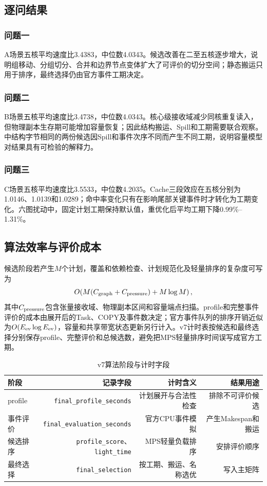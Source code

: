 \subsection{逐问结果}
\subsubsection{问题一}
A场景五核平均速度比3.4383，中位数4.0343。候选改善在二至五核逐步增大，说明组移动、分组切分、合并和边界节点变体扩大了可评价的切分空间；静态搬运只用于排序，最终选择仍由官方事件工期决定。

\subsubsection{问题二}
B场景五核平均速度比3.4738，中位数4.0343。核心级接收域减少同核重复读入，但物理副本生存期可能增加容量恢复；因此结构搬运、Spill和工期需要联合观察。中结构字节相同的两份候选因Spill和事件次序不同而产生不同工期，说明容量模型对结果具有可检验的解释力。

\subsubsection{问题三}
C场景五核平均速度比3.5533，中位数4.2035。Cache三段效应在五核分别为1.0146、1.0139和1.0289；命中率变化只有在影响尾部关键事件时才转化为工期变化。六图扰动中，固定计划工期保持默认值，重优化后平均工期下降0.99\%--1.31\%。

\subsection{算法效率与评价成本}
候选阶段若产生$M$个计划，覆盖和依赖检查、计划规范化及轻量排序的复杂度可写为
\begin{equation}
O\!\left(M(C_{\rm graph}+C_{\rm pressure})+M\log M\right),
\end{equation}
其中$C_{\rm pressure}$包含张量接收域、物理副本区间和容量端点扫描。profile和完整事件评价的成本由展开后的Task、COPY及事件数决定；官方事件队列的排序开销近似为$O(E_{\rm ev}\log E_{\rm ev})$，容量和共享带宽状态更新另行计入。v7计时表按候选和最终选择分别保存profile、完整评价和总候选数，避免把MPS轻量排序时间误写成官方工期。

\begin{table}[H]\centering\small
\caption{v7算法阶段与计时字段}\label{tab:algorithm-timing}
\begin{tabular}{lrrr}\toprule
阶段 & 记录字段 & 计时含义 & 结果用途\\\midrule
profile & \texttt{final\_profile\_seconds} & 计划展开与合法性检查 & 排除不可评价候选\\
事件评价 & \texttt{final\_evaluation\_seconds} & 官方CPU事件模拟 & 产生Makespan和搬运\\
候选排序 & \texttt{profile\_score}、\texttt{light\_time} & MPS轻量负载排序 & 安排评价顺序\\
最终选择 & \texttt{final\_selection} & 按工期、搬运、名称选优 & 写入主矩阵\\\bottomrule
\end{tabular}
\end{table}

